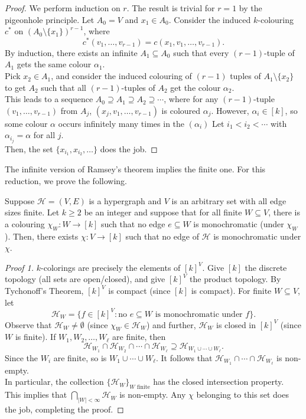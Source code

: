 	\begin{proof}
		We perform induction on $r$. The result is trivial for $r=1$ by the pigeonhole principle. Let $A_0 = V$ and $x_1 \in A_0$. Consider the induced $k$-colouring $c^*$ on $(A_0 \setminus \{x_1\})^{r-1}$, where
		\[ c^*(v_1,\ldots,v_{r-1}) = c(x_1,v_1,\ldots,v_{r-1}). \]
		By induction, there exists an infinite $A_1 \subseteq A_0$ such that every $(r-1)$-tuple of $A_1$ gets the same colour $\alpha_1$.\\
		Pick $x_2 \in A_1$, and consider the induced colouring of $(r-1)$ tuples of $A_1 \setminus \{x_2\}$ to get $A_2$ such that all $(r-1)$-tuples of $A_2$ get the colour $\alpha_2$.\\
		This leads to a sequence $A_0 \supseteq A_1 \supseteq A_2 \supseteq \cdots$, where for any $(r-1)$-tuple $(v_1,\ldots,v_{r-1})$ from $A_j$, $(x_j,v_1,\ldots,v_{r-1})$ is coloured $\alpha_j$. However, $\alpha_i \in [k]$, so some colour $\alpha$ occurs infinitely many times in the $(\alpha_i)$ Let $i_1 < i_2 < \cdots$ with $\alpha_{i_j} = \alpha$ for all $j$. \\
		Then, the set $\{x_{i_1}, x_{i_2}, \ldots\}$ does the job.
	\end{proof}

	The infinite version of Ramsey's theorem implies the finite one. For this reduction, we prove the following.

	\begin{ftheo}
		Suppose $\mathcal{H} = (V,E)$ is a hypergraph and $V$ is an arbitrary set with all edge sizes finite. Let $k \ge 2$ be an integer and suppose that for all finite $W \subseteq V$, there is a colouring $\chi_W : W \to [k]$ such that no edge $e \subseteq W$ is monochromatic (under $\chi_W$). Then, there exists $\chi : V \to [k]$ such that no edge of $\mathcal{H}$ is monochromatic under $\chi$.
	\end{ftheo}
	\begin{proof}[Proof 1]
		$k$-colorings are precisely the elements of $[k]^V$. Give $[k]$ the discrete topology (all sets are open/closed), and give $[k]^V$ the product topology. By Tychonoff's Theorem, $[k]^V$ is compact (since $[k]$ is compact). For finite $W \subseteq V$, let
		\[ \mathcal{H}_W = \{ f \in [k]^V : \text{no $e\subseteq W$ is monochromatic under $f$} \}. \]
		Observe that $\mathcal{H}_W \ne \emptyset$ (since $\chi_W \in \mathcal{H}_W$) and further, $\mathcal{H}_W$ is closed in $[k]^V$ (since $W$ is finite). If $W_1, W_2, \ldots, W_\ell$ are finite, then
		\[ \mathcal{H}_{W_1} \cap \mathcal{H}_{W_2} \cap \cdots \cap \mathcal{H}_{W_\ell} \supseteq \mathcal{H}_{W_1 \cup \cdots \cup W_\ell}. \]
		Since the $W_i$ are finite, so is $W_1 \cup \cdots \cup W_\ell$. It follows that $\mathcal{H}_{W_1} \cap \cdots \cap \mathcal{H}_{W_\ell}$ is non-empty.\\
		In particular, the collection $\{\mathcal{H}_W\}_{W\text{ finite}}$ has the closed intersection property. This implies that $\bigcap_{|W| < \infty} \mathcal{H}_W$ is non-empty. Any $\chi$ belonging to this set does the job, completing the proof.
	\end{proof}

